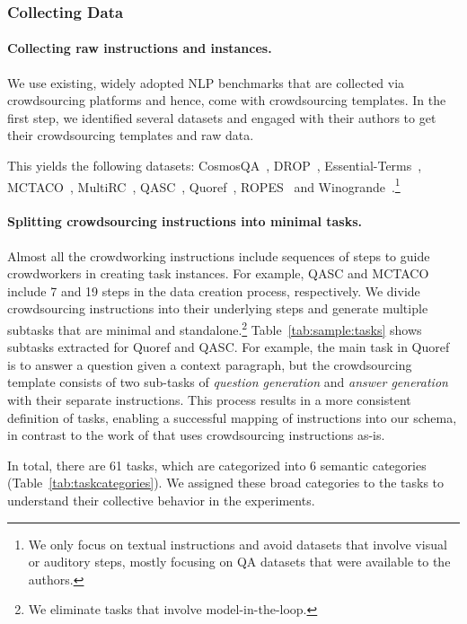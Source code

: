\subsubsection{Collecting Data}
\label{sec:datacollection}
\paragraph{Collecting raw instructions and instances.} We use existing, widely adopted NLP benchmarks that are collected via crowdsourcing platforms and hence, come with crowdsourcing templates. In the first step, we identified several datasets and engaged with their authors to get their crowdsourcing templates and raw data. 

This yields the following datasets: CosmosQA~\cite{huang2019cosmos}, DROP~\cite{dua2019drop}, Essential-Terms~\cite{khashabi2017learning}, MCTACO~\cite{zhou2019going}, MultiRC~\cite{khashabi2018looking}, QASC~\cite{khot2020qasc}, Quoref~\cite{dasigi2019quoref}, ROPES~\cite{lin2019reasoning} and
Winogrande~\cite{sakaguchi2020winogrande}.\footnote{
        We only focus on textual instructions and  avoid datasets that involve visual or auditory steps, mostly focusing on QA datasets that were available to the authors. } 

\paragraph{Splitting crowdsourcing instructions into minimal tasks.} Almost all the crowdworking instructions include sequences of steps to guide crowdworkers  in creating task instances. For example, QASC and MCTACO include 7 and 19 steps in the data creation process, respectively. We divide crowdsourcing instructions into their underlying steps and generate multiple subtasks that are minimal and standalone.\footnote{
    We eliminate tasks that involve model-in-the-loop. } Table~\ref{tab:sample:tasks} shows subtasks extracted for Quoref and QASC. For example, the main task in Quoref is to answer a question given a context paragraph, but the crowdsourcing template consists of two sub-tasks of {\it question generation}  and {\it answer generation} with their separate instructions.  This process  results in a more consistent definition of tasks, enabling a successful mapping of instructions into our schema,  in contrast to the work of \citet{efrat2020turking} that uses crowdsourcing instructions as-is. 

In total, there are 61 tasks, which are categorized into 6 semantic categories (Table~\ref{tab:taskcategories}). 
We assigned these broad categories to the tasks to understand their collective behavior in the experiments. 

